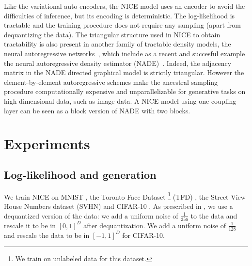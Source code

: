 \documentclass{article}
\begin{document}
Like the variational auto-encoders, the NICE model uses an encoder to avoid
the difficulties of inference, but its encoding is deterministic. %
The log-likelihood is tractable and the training procedure does not require any sampling (apart from dequantizing the data). 
The triangular structure used in NICE to obtain tractability is also present in another family of tractable density models, the
neural autoregressive networks~\citep{Bengio+Bengio-NIPS99}, which include as a recent and succesful example the
neural autoregressive density estimator (NADE)~\citep{Larochelle+Murray-2011}.
Indeed, the adjacency matrix in the
NADE directed graphical model is strictly triangular. However the
element-by-element autoregressive schemes make the ancestral sampling procedure computationally
expensive and unparallelizable for generative tasks on high-dimensional data, such as image data.
A NICE model using one coupling layer can be seen as a block version of NADE with two blocks.

\section{Experiments}
\subsection{Log-likelihood and generation}
We train NICE on MNIST \citep{lecun1998mnist}, the Toronto Face Dataset
\footnote{We train on unlabeled data for this dataset.}
(TFD) \citep{Susskind2010}, the Street View House Numbers dataset (SVHN)
\citep{Netzer-wkshp-2011} and CIFAR-10 \citep{Krizhevsky2010tr}. As
prescribed in \citep{Benigno-et-al-NIPS2013-small}, 
we use a dequantized version of the data: %
we add a uniform noise of $\frac{1}{256}$ to the data and
rescale it to be in $[0,1]^{D}$ after dequantization. We add a uniform noise of $\frac{1}{128}$
and rescale the data to be in $[-1,1]^{D}$ for CIFAR-10.
\end{document}
